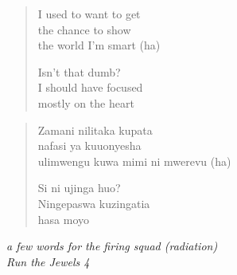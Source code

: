 \clearpage\thispagestyle{empty}\vspace*{\fill}

\begin{verse}
I used to want to get \\
the chance to show \\
the world I'm smart (ha)

Isn't that dumb? \\
I should have focused \\
mostly on the heart
\end{verse}
\begin{verse}\small
Zamani nilitaka kupata \\
nafasi ya kuuonyesha \\
ulimwengu kuwa mimi ni mwerevu (ha)

Si ni ujinga huo? \\
Ningepaswa kuzingatia \\
hasa moyo
\end{verse}
\begin{flushright}\small\itshape
a few words for the firing squad (radiation) \\
Run the Jewels 4
\end{flushright}

\vspace*{\fill}\clearpage
